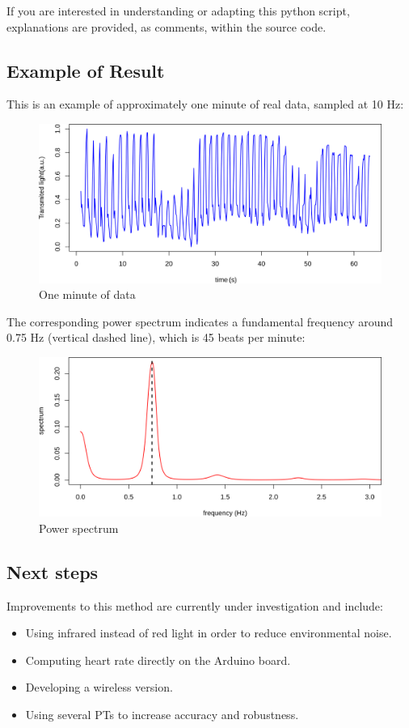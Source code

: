 \documentclass[]{article}
\begin{document}
If you are interested in understanding or adapting this python script,
explanations are provided, as comments, within the source code.

\subsection{Example of Result}\label{example-of-result}

This is an example of approximately one minute of real data, sampled at
10 Hz:

\begin{figure}[htbp]
\centering
\includegraphics{./img/one_min_data.png}
\caption{One minute of data}
\end{figure}

The corresponding power spectrum indicates a fundamental frequency
around 0.75 Hz (vertical dashed line), which is 45 beats per minute:

\begin{figure}[htbp]
\centering
\includegraphics{./img/power_spectrum.png}
\caption{Power spectrum}
\end{figure}

\subsection{Next steps}\label{next-steps}

Improvements to this method are currently under investigation and
include:

\begin{itemize}
\itemsep1pt\parskip0pt
\item
  Using infrared instead of red light in order to reduce environmental
  noise.
\item
  Computing heart rate directly on the Arduino board.
\item
  Developing a wireless version.
\item
  Using several PTs to increase accuracy and robustness.
\end{itemize}
\end{document}
